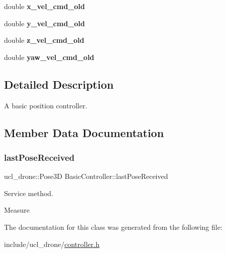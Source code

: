\begin{DoxyCompactItemize}
\mbox{\label{classBasicController_a0a30a5cee02df2b8c4acefae8dda49b9}} 
double {\bfseries x\+\_\+vel\+\_\+cmd\+\_\+old}
\item 
\mbox{\label{classBasicController_a9cb6f3c560f37b1e8634b53e5e915941}} 
double {\bfseries y\+\_\+vel\+\_\+cmd\+\_\+old}
\item 
\mbox{\label{classBasicController_a0ac1af77e241c0dbb07dcf7e5b0a6465}} 
double {\bfseries z\+\_\+vel\+\_\+cmd\+\_\+old}
\item 
\mbox{\label{classBasicController_a63cdc89bf058ac27463644a4f6e73d2d}} 
double {\bfseries yaw\+\_\+vel\+\_\+cmd\+\_\+old}
\end{DoxyCompactItemize}


\subsection{Detailed Description}
A basic position controller. 

\subsection{Member Data Documentation}
\mbox{\label{classBasicController_aa888b6ee902621dff3d9e551e83b0dcb}} 
\subsubsection{\texorpdfstring{last\+Pose\+Received}{lastPoseReceived}}
{\footnotesize\ttfamily ucl\+\_\+drone\+::\+Pose3D Basic\+Controller\+::last\+Pose\+Received}



Service method. 

Measure 

The documentation for this class was generated from the following file\+:\begin{DoxyCompactItemize}
\item 
include/ucl\+\_\+drone/\hyperlink{controller_8h}{controller.\+h}\end{DoxyCompactItemize}
